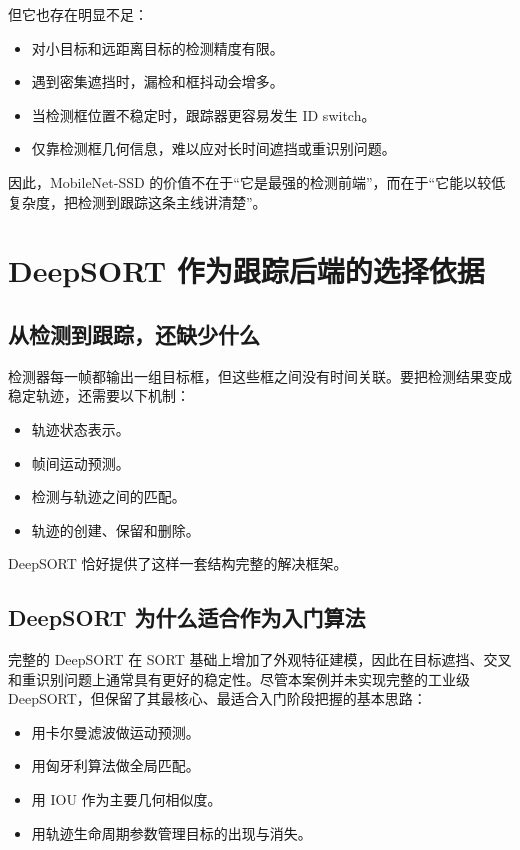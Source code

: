 但它也存在明显不足：

\begin{itemize}
\tightlist
\item
  对小目标和远距离目标的检测精度有限。
\item
  遇到密集遮挡时，漏检和框抖动会增多。
\item
  当检测框位置不稳定时，跟踪器更容易发生 ID switch。
\item
  仅靠检测框几何信息，难以应对长时间遮挡或重识别问题。
\end{itemize}

因此，MobileNet-SSD
的价值不在于``它是最强的检测前端''，而在于``它能以较低复杂度，把检测到跟踪这条主线讲清楚''。

\section{DeepSORT
作为跟踪后端的选择依据}\label{src-experiment-case2-h17}

\subsection{从检测到跟踪，还缺少什么}\label{src-experiment-case2-h18}

检测器每一帧都输出一组目标框，但这些框之间没有时间关联。要把检测结果变成稳定轨迹，还需要以下机制：

\begin{itemize}
\tightlist
\item
  轨迹状态表示。
\item
  帧间运动预测。
\item
  检测与轨迹之间的匹配。
\item
  轨迹的创建、保留和删除。
\end{itemize}

DeepSORT 恰好提供了这样一套结构完整的解决框架。

\subsection{DeepSORT
为什么适合作为入门算法}\label{src-experiment-case2-h19}

完整的 DeepSORT 在 SORT
基础上增加了外观特征建模，因此在目标遮挡、交叉和重识别问题上通常具有更好的稳定性。尽管本案例并未实现完整的工业级
DeepSORT，但保留了其最核心、最适合入门阶段把握的基本思路：

\begin{itemize}
\tightlist
\item
  用卡尔曼滤波做运动预测。
\item
  用匈牙利算法做全局匹配。
\item
  用 IOU 作为主要几何相似度。
\item
  用轨迹生命周期参数管理目标的出现与消失。
\end{itemize}

